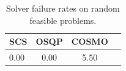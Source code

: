 \begin{table}
\centering
\caption{Solver failure rates on random feasible problems.}
\label{t-random feasible-failure}
\begin{tabular}{lccc}
\toprule
 SCS &  OSQP &  COSMO \\
\midrule
0.00 &  0.00 &   5.50 \\
\bottomrule
\end{tabular}
\end{table}
